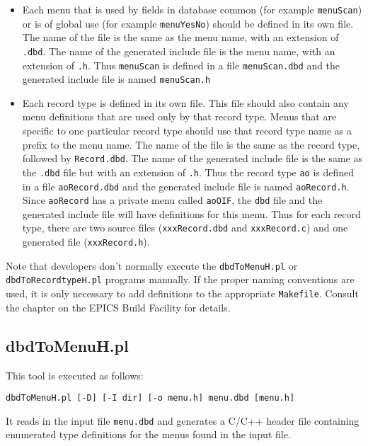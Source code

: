 \begin{itemize}
\item Each menu that is used by fields in database common (for example \verb|menuScan|) or is of global use (for example \verb|menuYesNo|) should be defined in its own file.
The name of the file is the same as the menu name, with an extension of \verb|.dbd|.
The name of the generated include file is the menu name, with an extension of \verb|.h|.
Thus \verb|menuScan| is defined in a file \verb|menuScan.dbd| and the generated include file is named \verb|menuScan.h|

\item Each record type is defined in its own file.
This file should also contain any menu definitions that are used only by that record type.
Menus that are specific to one particular record type should use that record type name as a prefix to the menu name.
The name of the file is the same as the record type, followed by \verb|Record.dbd|.
The name of the generated include file is the same as the \verb|.dbd| file but with an extension of \verb|.h|.
Thus the record type \verb|ao| is defined in a file \verb|aoRecord.dbd| and the generated include file is named \verb|aoRecord.h|.
Since \verb|aoRecord| has a private menu called \verb|aoOIF|, the \verb|dbd| file and the generated include file will have definitions for this menu.
Thus for each record type, there are two source files (\verb|xxxRecord.dbd| and \verb|xxxRecord.c|) and one generated file (\verb|xxxRecord.h|).
\end{itemize}

Note that developers don't normally execute the \verb|dbdToMenuH.pl| or \verb|dbdToRecordtypeH.pl| programs manually.
If the proper naming conventions are used, it is only necessary to add definitions to the appropriate \verb|Makefile|.
Consult the chapter on the EPICS Build Facility for details.

\subsection{dbdToMenuH.pl}

This tool is executed as follows:

\begin{verbatim}
dbdToMenuH.pl [-D] [-I dir] [-o menu.h] menu.dbd [menu.h]
\end{verbatim}

It reads in the input file \verb|menu.dbd| and generates a C/C++ header file containing enumerated type definitions for the menus found in the input file.

